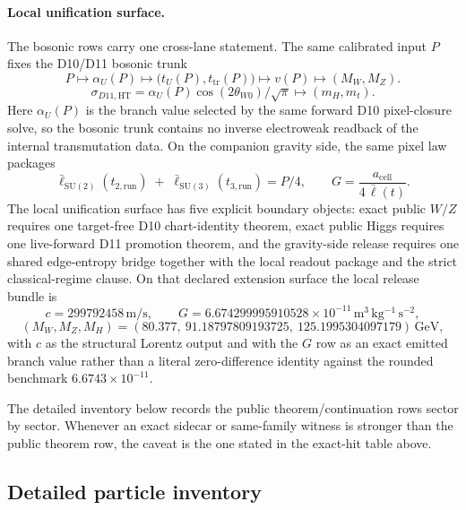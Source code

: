 \documentclass[11pt]{article}
\newcommand{\ellbar}{\bar{\ell}}
\begin{document}
\paragraph{Local unification surface.}
The bosonic rows carry one cross-lane statement. The same calibrated input \(P\) fixes the
D10/D11 bosonic trunk
\[
P
\longmapsto
\alpha_U(P)
\longmapsto
\bigl(t_U(P),t_{\mathrm{tr}}(P)\bigr)
\longmapsto
v(P)
\longmapsto
\left(M_W,M_Z\right).
\]
\[
\sigma_{D11,\mathrm{HT}}
=
\alpha_U(P)\cos(2\theta_{W0})/\sqrt{\pi}
\longmapsto
\left(m_H,m_t\right).
\]
Here \(\alpha_U(P)\) is the branch value selected by the same forward D10 pixel-closure solve, so
the bosonic trunk contains no inverse electroweak readback of the internal transmutation data.
On the companion gravity side, the same pixel law packages
\[
\ellbar_{\mathrm{SU(2)}}(t_{2,\mathrm{run}})
\;+\;
\ellbar_{\mathrm{SU(3)}}(t_{3,\mathrm{run}})
=
P/4,
\qquad
G=\frac{a_{\mathrm{cell}}}{4\,\ellbar(t)}.
\]
The local unification surface has five explicit boundary objects: exact public \(W/Z\) requires
one target-free D10 chart-identity theorem, exact public Higgs requires one live-forward D11
promotion theorem, and the gravity-side release requires one shared edge-entropy bridge together
with the local readout package and the strict classical-regime clause. On that declared extension surface
the local release bundle is
\[
c=299792458\,\mathrm{m/s},
\qquad
G=6.674299995910528\times10^{-11}\,\mathrm{m^3\,kg^{-1}\,s^{-2}},
\]
\[
(M_W,M_Z,M_H)=
(80.377,\ 91.18797809193725,\ 125.1995304097179)\,\mathrm{GeV},
\]
with \(c\) as the structural Lorentz output and with the \(G\) row as an exact emitted branch
value rather than a literal zero-difference identity against the rounded benchmark
\(6.6743\times10^{-11}\).

The detailed inventory below records the public theorem/continuation rows sector by sector. Whenever an exact sidecar or same-family witness is stronger than the public theorem row, the caveat is the one stated in the exact-hit table above.

\subsection{Detailed particle inventory}
\end{document}
